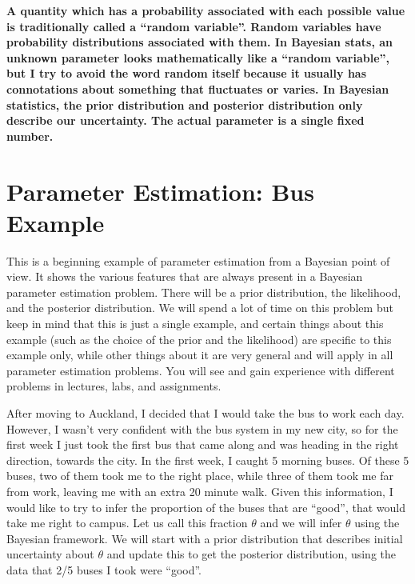\begin{framed}
{\bf
A quantity which has a probability associated with each possible value is
traditionally called a ``random variable''. Random variables have probability
distributions associated with them. In Bayesian stats, an unknown
parameter looks mathematically like a ``random variable'', but I try to avoid
the word random itself because it usually has connotations about something that
fluctuates or varies. In Bayesian statistics, the prior distribution and
posterior distribution only describe our uncertainty. The actual parameter is
a single fixed number.}
\end{framed} 

\section{Parameter Estimation: Bus Example}
This is a beginning example of parameter estimation from a Bayesian point of
view. It shows the various features that are always present in a Bayesian
parameter estimation problem. There will be a prior distribution, the likelihood,
and the posterior distribution. We will spend a lot of time on this problem but
keep in mind that this is just a single example, and certain things about this
example (such as the choice of the prior and the likelihood) are specific to
this example only, while other things about it are very general and will apply
in all parameter estimation problems. You will see and gain experience with
different problems in lectures, labs, and assignments.

After moving to Auckland, I decided that I would take the bus to work
each day. However, I wasn't very confident with the bus system in my new city,
so for the first
week I just took the first bus that came along and was heading in the right
direction, towards the city. In the first week, I caught 5 morning buses.
Of these 5 buses, two of them took me to the right place, while three of them
took me far from work, leaving me with an extra 20 minute walk. Given this
information, I would like to try to infer the proportion
of the buses that are ``good'', that would take me right to campus. Let us call
this fraction $\theta$ and we will infer $\theta$ using the Bayesian framework.
We will start with a prior distribution that describes initial uncertainty about
$\theta$ and update this to get the posterior distribution, using the data that
2/5 buses I took were ``good''.

